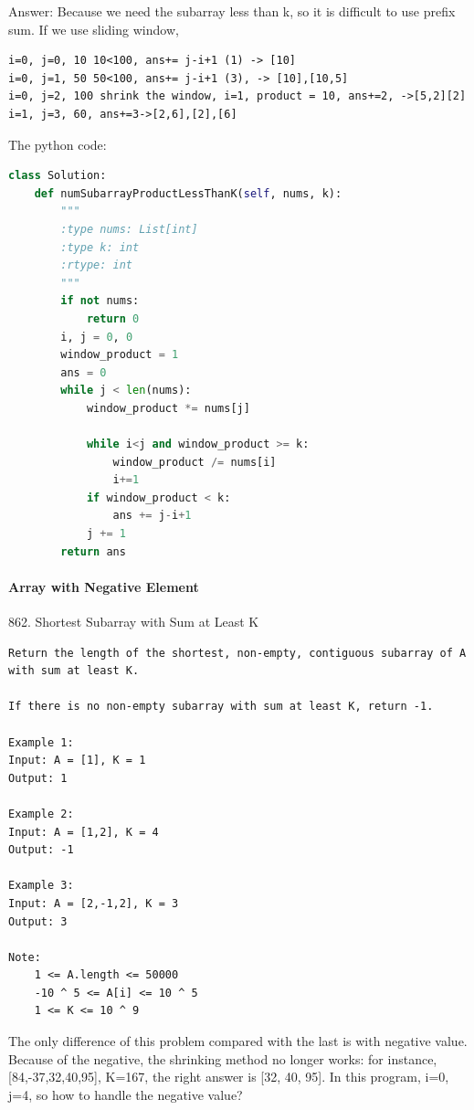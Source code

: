 \documentclass[../specific-algorithms.tex]{subfiles}
\begin{document}
Answer: Because we need the subarray less than k, so it is difficult to use prefix sum. If we use sliding window,
\begin{lstlisting}
i=0, j=0, 10 10<100, ans+= j-i+1 (1) -> [10]
i=0, j=1, 50 50<100, ans+= j-i+1 (3), -> [10],[10,5]
i=0, j=2, 100 shrink the window, i=1, product = 10, ans+=2, ->[5,2][2]
i=1, j=3, 60, ans+=3->[2,6],[2],[6]
\end{lstlisting}
The python code:
\begin{lstlisting}[language = Python]
class Solution:
    def numSubarrayProductLessThanK(self, nums, k):
        """
        :type nums: List[int]
        :type k: int
        :rtype: int
        """
        if not nums:
            return 0
        i, j = 0, 0
        window_product = 1
        ans = 0
        while j < len(nums):
            window_product *= nums[j]
            
            while i<j and window_product >= k:
                window_product /= nums[i]               
                i+=1
            if window_product < k:
                ans += j-i+1            
            j += 1
        return ans
\end{lstlisting}

\paragraph{Array with Negative Element}

862. Shortest Subarray with Sum at Least K
\begin{lstlisting}
Return the length of the shortest, non-empty, contiguous subarray of A with sum at least K.

If there is no non-empty subarray with sum at least K, return -1.

Example 1:
Input: A = [1], K = 1
Output: 1

Example 2:
Input: A = [1,2], K = 4
Output: -1

Example 3:
Input: A = [2,-1,2], K = 3
Output: 3

Note:
    1 <= A.length <= 50000
    -10 ^ 5 <= A[i] <= 10 ^ 5
    1 <= K <= 10 ^ 9
\end{lstlisting}
The only difference of this problem compared with the last is with negative value. Because of the negative, the shrinking method no longer works: for instance, [84,-37,32,40,95], K=167, the right answer is [32, 40, 95]. In this program, i=0, j=4, so how to handle the negative value?
\end{document}
